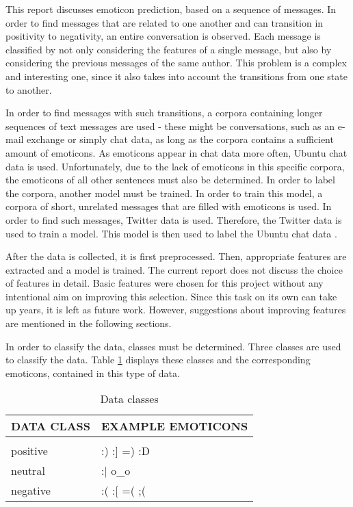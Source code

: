 This report discusses emoticon prediction, based on a sequence of messages. In order to find messages that are related to one another and can transition in positivity to negativity, an entire conversation is observed. Each message is classified by not only considering the features of a single message, but also by considering the previous messages of the same author. This problem is a complex and interesting one, since it also takes into account the transitions from one state to another.

\noindent In order to find messages with such transitions, a corpora containing longer sequences of text messages are used - these might be conversations, such as an e-mail exchange or simply chat data, as long as the corpora contains a sufficient amount of emoticons. As emoticons appear in chat data more often, Ubuntu chat data is used. Unfortunately, due to the lack of emoticons in this specific corpora, the emoticons of all other sentences must also be determined. In order to label the corpora, another model must be trained. In order to train this model, a corpora of short, unrelated messages that are filled with emoticons is used. In order to find such messages, Twitter \cite{twittersentiment} data is used. Therefore, the Twitter data is used to train a model. This model is then used to label the Ubuntu chat data \cite{ubuntudata}. 

\noindent After the data is collected, it is first preprocessed. Then, appropriate features are extracted and a model is trained. The current report does not discuss the choice of features in detail. Basic features were chosen for this project without any intentional aim on improving this selection. Since this task on its own can take up years, it is left as future work. However, suggestions about improving features are mentioned in the following sections.

\noindent In order to classify the data, classes must be determined. Three classes are used to classify the data. Table \ref{tab:classes} displays these classes and the corresponding emoticons, contained in this type of data.

\begin{table}[h!]
\caption{Data classes}
\label{tab:classes}
\begin{center}
\begin{tabular}{ll}
\multicolumn{1}{l}{\bf DATA CLASS}  &\multicolumn{1}{l}{\bf EXAMPLE EMOTICONS}
\\ \hline \\
positive 			& :) \: \:  			:] \: \: 		=) \: \: 		:D  	\\
neutral 				& :$\vert$ \: \: 	o\_o  								\\
negative 			& :( \: \: 			:[ \: \: 		=( \: \: 		;( 		\\
\end{tabular}{}
\end{center}
\end{table}

